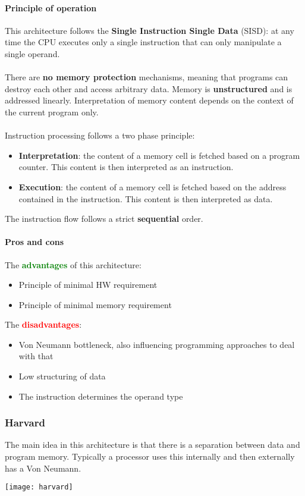 \paragraph{Principle of operation}
This architecture follows the \textbf{Single Instruction Single Data} (SISD): at any time the CPU executes only a single instruction that can only manipulate a single operand.\\\\
There are \textbf{no memory protection} mechanisms, meaning that programs can destroy each other and access arbitrary data. Memory is \textbf{unstructured} and is addressed linearly. Interpretation of memory content depends on the context of the current program only.\\\\
Instruction processing follows a two phase principle:
\begin{itemize}
	\item \textbf{Interpretation}: the content of a memory cell is fetched based on a program counter. This
	content is then interpreted as an instruction.	
	\item \textbf{Execution}: the content of a memory cell is fetched based on the address contained in the
	instruction. This content is then interpreted as data.
\end{itemize}
\begin{note}
	The instruction flow follows a strict \textbf{sequential} order.	
\end{note}

\paragraph{Pros and cons}
The \textcolor{green}{\textbf{advantages}} of this architecture:
\begin{itemize}
	\item Principle of minimal HW requirement
	\item Principle of minimal memory requirement
\end{itemize}
The \textcolor{red}{\textbf{disadvantages}}:
\begin{itemize}
	\item Von Neumann bottleneck, also influencing programming approaches to deal with that
	\item Low structuring of data
	\item The instruction determines the operand type
\end{itemize}

\subsubsection{Harvard}
The main idea in this architecture is that there is a separation between data and program memory. Typically a processor uses this internally and then externally has a Von Neumann.
\begin{center}
	\texttt{[image: harvard]}
\end{center}

